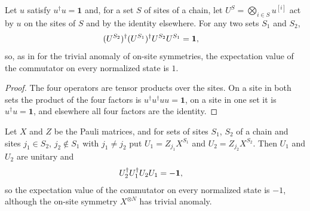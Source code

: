 \begin{lemma}
    \label{thm:mpug_onsite_truncation_commutator}
    \leanok
    Let $u$ satisfy $u^\dagger u=\mathbf 1$ and, for a set $S$ of sites of a
    chain, let $U^S=\bigotimes_{i\in S}u^{[i]}$ act by $u$ on the sites of $S$
    and by the identity elsewhere. For any two sets $S_1$ and $S_2$,
    \begin{align}
        (U^{S_2})^\dagger(U^{S_1})^\dagger U^{S_2}U^{S_1}
         & =\mathbf 1,
        \notag
    \end{align}
    so, as in \cite[Section~V]{GarreRubioSchuch2024DomainWall} for the
    trivial anomaly of on-site symmetries, the expectation value of the
    commutator on every normalized state is $1$.
\end{lemma}

\begin{proof}\leanok
    The four operators are tensor products over the sites. On a site in both
    sets the product of the four factors is
    $u^\dagger u^\dagger uu=\mathbf 1$, on a site in one set it is
    $u^\dagger u=\mathbf 1$, and elsewhere all four factors are the
    identity.
\end{proof}

\begin{lemma}
    \label{thm:mpug_truncation_detector_endpoint_dependence}
    \leanok
    Let $X$ and $Z$ be the Pauli matrices, and for sets of sites $S_1$, $S_2$
    of a chain and sites $j_1\in S_2$, $j_2\notin S_1$ with $j_1\neq j_2$ put
    $U_1=Z_{j_1}X^{S_1}$ and $U_2=Z_{j_2}X^{S_2}$. Then $U_1$ and $U_2$ are
    unitary and
    \begin{align}
        U_2^\dagger U_1^\dagger U_2U_1
         & =-\mathbf 1,
        \notag
    \end{align}
    so the expectation value of the commutator on every normalized state is
    $-1$, although the on-site symmetry $X^{\otimes N}$ has trivial anomaly.
\end{lemma}

